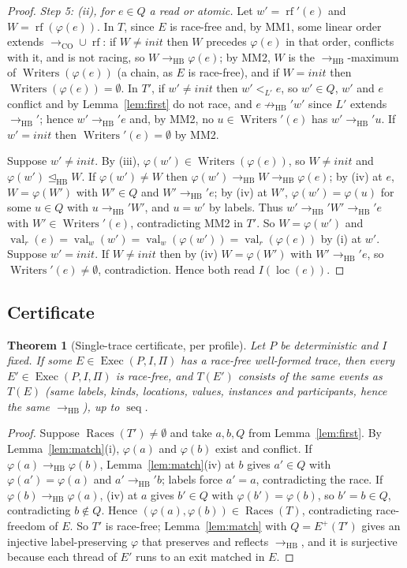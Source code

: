 \documentclass[11pt]{article}
\newtheorem{theorem}{Theorem}
\theoremstyle{remark}
\DeclareMathOperator{\seq}{seq}
\DeclareMathOperator{\loc}{loc}
\DeclareMathOperator{\Races}{Races}
\DeclareMathOperator{\Writers}{Writers}
\DeclareMathOperator{\Exec}{Exec}
\DeclareMathOperator{\val}{val}
\DeclareMathOperator{\rf}{rf}
\newcommand{\HB}{\to_{\mathrm{HB}}}
\newcommand{\HBr}{\trianglelefteq_{\mathrm{HB}}}
\newcommand{\CO}{\to_{\mathrm{CO}}}
\newcommand{\Eplus}{E^{+}}
\begin{document}
\begin{proof}
\emph{Step 5: (ii), for $e\in Q$ a read or atomic.} Let $w'=\rf'(e)$ and
$W=\rf(\varphi(e))$. In $T$, since $E$ is race-free and, by MM1, some linear
order extends $\CO\cup\rf$: if $W\ne\mathit{init}$ then $W$ precedes
$\varphi(e)$ in that order, conflicts with it, and is not racing, so
$W\HB\varphi(e)$; by MM2, $W$ is the $\HB$-maximum of $\Writers(\varphi(e))$
(a chain, as $E$ is race-free), and if $W=\mathit{init}$ then
$\Writers(\varphi(e))=\emptyset$. In $T'$, if $w'\ne\mathit{init}$ then
$w'<_{L'}e$, so $w'\in Q$, $w'$ and $e$ conflict and by Lemma~\ref{lem:first}
do not race, and $e\not\HB' w'$ since $L'$ extends $\HB'$; hence $w'\HB' e$ and,
by MM2, no $u\in\Writers'(e)$ has $w'\HB' u$. If $w'=\mathit{init}$ then
$\Writers'(e)=\emptyset$ by MM2.

Suppose $w'\ne\mathit{init}$. By (iii), $\varphi(w')\in\Writers(\varphi(e))$, so
$W\ne\mathit{init}$ and $\varphi(w')\HBr W$. If $\varphi(w')\ne W$ then
$\varphi(w')\HB W\HB\varphi(e)$; by (iv) at $e$, $W=\varphi(W')$ with $W'\in Q$
and $W'\HB' e$; by (iv) at $W'$, $\varphi(w')=\varphi(u)$ for some $u\in Q$ with
$u\HB' W'$, and $u=w'$ by labels. Thus $w'\HB' W'\HB' e$ with
$W'\in\Writers'(e)$, contradicting MM2 in $T'$. So $W=\varphi(w')$ and
$\val_r(e)=\val_w(w')=\val_w(\varphi(w'))=\val_r(\varphi(e))$ by (i) at $w'$.
Suppose $w'=\mathit{init}$. If $W\ne\mathit{init}$ then by (iv) $W=\varphi(W')$
with $W'\HB' e$, so $\Writers'(e)\ne\emptyset$, contradiction. Hence both read
$I(\loc(e))$.
\end{proof}

\subsection{Certificate}

\begin{theorem}[Single-trace certificate, per profile]\label{thm:cert}
Let $P$ be deterministic and $I$ fixed. If some $E\in\Exec(P,I,\Pi)$ has a
race-free well-formed trace, then every $E'\in\Exec(P,I,\Pi)$ is race-free, and
$T(E')$ consists of the same events as $T(E)$ (same labels, kinds, locations,
values, instances and participants, hence the same $\HB$), up to $\seq$.
\end{theorem}

\begin{proof}
Suppose $\Races(T')\ne\emptyset$ and take $a,b,Q$ from Lemma~\ref{lem:first}.
By Lemma~\ref{lem:match}(i), $\varphi(a)$ and $\varphi(b)$ exist and conflict.
If $\varphi(a)\HB\varphi(b)$, Lemma~\ref{lem:match}(iv) at $b$ gives $a'\in Q$ with
$\varphi(a')=\varphi(a)$ and $a'\HB' b$; labels force $a'=a$, contradicting the
race. If $\varphi(b)\HB\varphi(a)$, (iv) at $a$ gives $b'\in Q$ with
$\varphi(b')=\varphi(b)$, so $b'=b\in Q$, contradicting $b\notin Q$. Hence
$(\varphi(a),\varphi(b))\in\Races(T)$, contradicting race-freedom of $E$.
So $T'$ is race-free; Lemma~\ref{lem:match} with $Q=\Eplus(T')$ gives an
injective label-preserving $\varphi$ that preserves and reflects $\HB$, and it
is surjective because each thread of $E'$ runs to an exit matched in $E$.
\end{proof}
\end{document}
